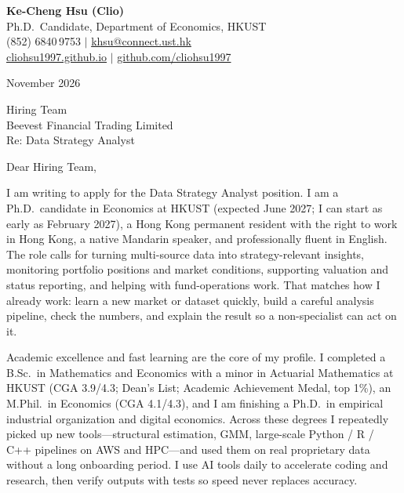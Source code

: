 \documentclass[11pt,letterpaper]{article}
\begin{document}
\noindent
{\bfseries Ke-Cheng Hsu (Clio)}\\
Ph.D.\ Candidate, Department of Economics, HKUST\\
(852) 6840\,9753 \quad $|$ \quad \href{mailto:khsu@connect.ust.hk}{khsu@connect.ust.hk}\\
\href{https://cliohsu1997.github.io/}{cliohsu1997.github.io} \quad $|$ \quad \href{https://github.com/cliohsu1997}{github.com/cliohsu1997}

\vspace{0.4em}
 November 2026

\vspace{0.3em}
\noindent
Hiring Team\\
Beevest Financial Trading Limited\\
Re: Data Strategy Analyst

\vspace{0.15em}
Dear Hiring Team,

I am writing to apply for the Data Strategy Analyst position. I am a Ph.D.\ candidate in Economics at HKUST (expected June 2027; I can start as early as February 2027), a Hong Kong permanent resident with the right to work in Hong Kong, a native Mandarin speaker, and professionally fluent in English. The role calls for turning multi-source data into strategy-relevant insights, monitoring portfolio positions and market conditions, supporting valuation and status reporting, and helping with fund-operations work. That matches how I already work: learn a new market or dataset quickly, build a careful analysis pipeline, check the numbers, and explain the result so a non-specialist can act on it.

Academic excellence and fast learning are the core of my profile. I completed a B.Sc.\ in Mathematics and Economics with a minor in Actuarial Mathematics at HKUST (CGA 3.9/4.3; Dean's List; Academic Achievement Medal, top 1\%), an M.Phil.\ in Economics (CGA 4.1/4.3), and I am finishing a Ph.D.\ in empirical industrial organization and digital economics. Across these degrees I repeatedly picked up new tools---structural estimation, GMM, large-scale Python / R / C++ pipelines on AWS and HPC---and used them on real proprietary data without a long onboarding period. I use AI tools daily to accelerate coding and research, then verify outputs with tests so speed never replaces accuracy.
\end{document}
